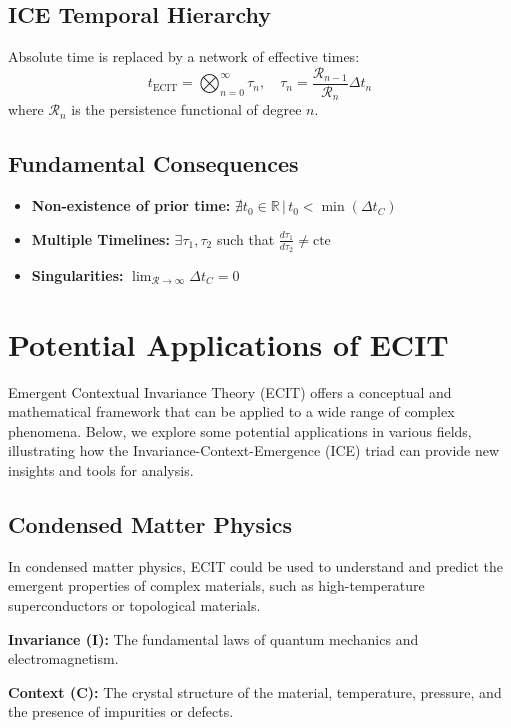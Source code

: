 \documentclass{article}
\begin{document}
\subsection{ICE Temporal Hierarchy}
Absolute time is replaced by a network of effective times:
\begin{equation}\label{tECIT}
t_{\text{ECIT}} = \bigotimes_{n=0}^\infty \tau_n, \quad \tau_n = \frac{\mathcal{R}_{n-1}}{\mathcal{R}_n} \Delta t_n
\end{equation}
where $\mathcal{R}_n$ is the persistence functional of degree $n$.

\subsection{Fundamental Consequences}
\begin{itemize}
\item \textbf{Non-existence of prior time:} $\nexists t_0 \in \mathbb{R} \,|\, t_0 < \min(\Delta t_C)$
\item \textbf{Multiple Timelines:} $\exists \tau_1, \tau_2$ such that $\frac{d\tau_1}{d\tau_2} \neq \text{cte}$
\item \textbf{Singularities:} $\lim_{\mathcal{R} \to \infty} \Delta t_C = 0$
\end{itemize}


\section{Potential Applications of ECIT}\label{sec:aplicaciones}

Emergent Contextual Invariance Theory (ECIT) offers a conceptual and mathematical framework that can be applied to a wide range of complex phenomena. Below, we explore some potential applications in various fields, illustrating how the Invariance-Context-Emergence (ICE) triad can provide new insights and tools for analysis.

\subsection{Condensed Matter Physics}

In condensed matter physics, ECIT could be used to understand and predict the emergent properties of complex materials, such as high-temperature superconductors or topological materials.

\textbf{Invariance (I):} The fundamental laws of quantum mechanics and electromagnetism.

\textbf{Context (C):} The crystal structure of the material, temperature, pressure, and the presence of impurities or defects.
\end{document}
